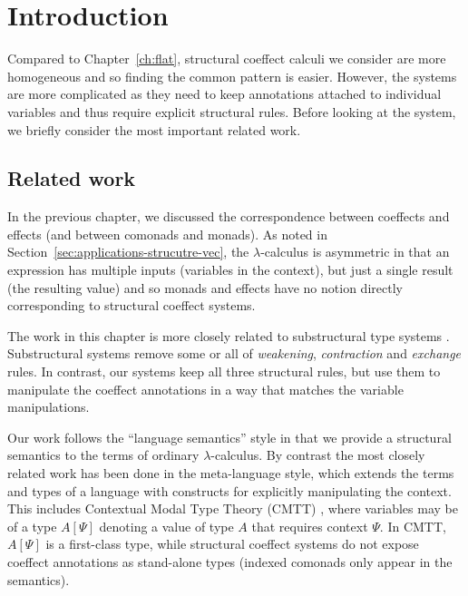 \section{Introduction}
\label{sec:structural-intro}

Compared to Chapter~\ref{ch:flat}, structural coeffect calculi we consider are more homogeneous and
so finding the common pattern is easier. However, the systems are more complicated as they need to
keep annotations attached to individual variables and thus require explicit structural rules. Before
looking at the system, we briefly consider the most important related work.


\subsection{Related work}

In the previous chapter, we discussed the correspondence between coeffects and effects (and
between comonads and monads). As noted in Section~\ref{sec:applications-strucutre-vec}, the
$\lambda$-calculus is asymmetric in that an expression has multiple inputs (variables in the
context), but just a single result (the resulting value) and so monads and effects have no notion
directly corresponding to structural coeffect systems.

The work in this chapter is more closely related to substructural type systems \cite{substruct-attpl-intro}.
Substructural systems remove some or all of \emph{weakening}, \emph{contraction} and
\emph{exchange} rules. In contrast, our systems keep all three structural rules, but use them to
manipulate the coeffect annotations in a way that matches the variable manipulations.

Our work follows the ``language semantics'' style in that we provide a structural semantics to
the terms of ordinary $\lambda$-calculus. By contrast the most closely related work has been done in
the meta-language style, which extends the terms and types of a language with constructs for explicitly
manipulating the context. This includes Contextual Modal Type Theory (CMTT) \cite{logic-cmtt}, where variables
may be of a type $A[\Psi]$ denoting a value of type $A$ that requires context $\Psi$. In CMTT,
$A[\Psi]$ is a first-class type, while structural coeffect systems do not expose coeffect
annotations as stand-alone types (indexed comonads only appear in the semantics).

